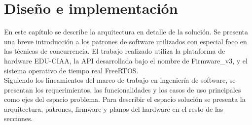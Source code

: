 \chapter{Diseño e implementación} %

En este capítulo se describe la arquitectura en detalle de la solución. Se presenta una breve introducción a los patrones de software utilizados con especial foco en las técnicas de concurrencia. El trabajo realizado utiliza la plataforma de hardware EDU-CIAA, la API desarrollada bajo el nombre de Firmware_v3, y el sistema operativo de tiempo real FreeRTOS.\\

Siguiendo los lineamientos del marco de trabajo en ingeniería de software, se presentan los requerimientos, las funcionalidades y los casos de uso principales como ejes del espacio problema. Para describir el espacio solución se presenta la arquitectura, patrones, firmware y planos del hardware en el resto de las secciones.\\


\label{Chapter3} %


